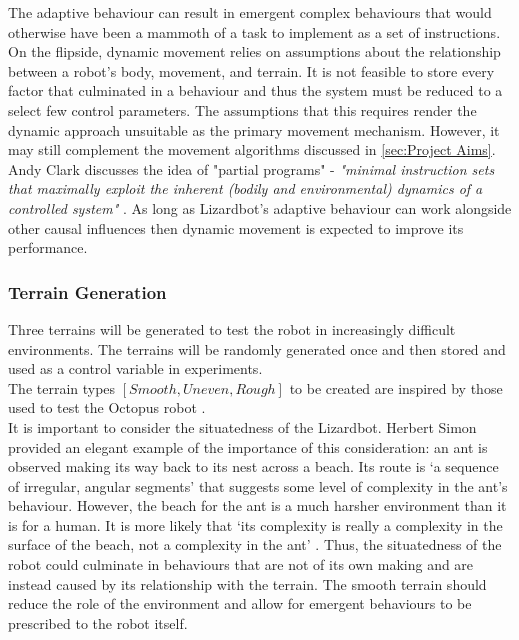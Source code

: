 \documentclass{article}
\begin{document}
The adaptive behaviour can result in emergent complex behaviours that would otherwise have been a mammoth of a task to implement as a set of instructions. On the flipside, dynamic movement relies on assumptions about the relationship between a robot's body, movement, and terrain. It is not feasible to store every factor that culminated in a behaviour and thus the system must be reduced to a select few control parameters. The assumptions that this requires render the dynamic approach unsuitable as the primary movement mechanism. However, it may still complement the movement algorithms discussed in \autoref{sec:Project Aims}. Andy Clark discusses the idea of "partial programs"  - \textit{"minimal instruction sets that maximally exploit the inherent (bodily and environmental) dynamics of a controlled system"} . As long as Lizardbot's adaptive behaviour can work alongside other causal influences then dynamic movement is expected to improve its performance.
 



\newpage
\subsubsection{Terrain Generation}
\label{sec:Terrain Generation}
Three terrains will be generated to test the robot in increasingly difficult environments. The terrains will be randomly generated once and then stored and used as a control variable in experiments.\\ 
The terrain types $[Smooth, Uneven, Rough]$ to be created are inspired by those used to test the Octopus robot .\\

It is important to consider the situatedness of the Lizardbot. Herbert Simon provided an elegant example of the importance of this consideration: an ant is observed making its way back to its nest across a beach.
Its route is ‘a sequence of irregular, angular segments’ that suggests some level of complexity in the ant's behaviour. However, the beach for the ant is a much harsher environment than it is for a human. It is more likely that ‘its complexity is really a complexity in the surface of the beach, not a complexity in the ant’ . Thus, the situatedness of the robot could culminate in behaviours that are not of its own making and are instead caused by its relationship with the terrain. The smooth terrain should reduce the role of the environment and allow for emergent behaviours to be prescribed to the robot itself.\\
\end{document}
